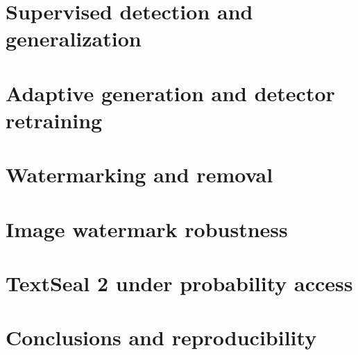 

\section{Supervised detection and generalization}
\label{sec:supervised}



\section{Adaptive generation and detector retraining}
\label{sec:adaptation}







\section{Watermarking and removal}
\label{sec:watermarking}








\section{Image watermark robustness}
\label{sec:image_robustness}









\FloatBarrier
\section{TextSeal 2 under probability access}
\label{sec:text_robustness}








\section{Conclusions and reproducibility}
\label{sec:conclusions}


